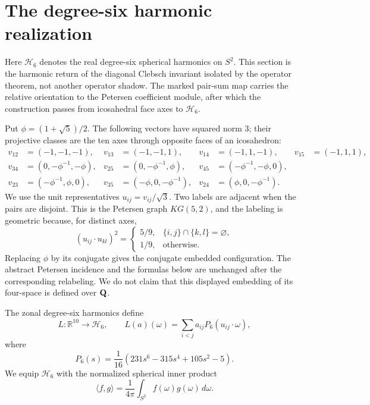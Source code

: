\section{The degree-six harmonic realization}
\label{sec:harmonic}

Here \(\mathcal H_6\) denotes the real degree-six spherical harmonics on
\(S^2\).  This section is the harmonic return of the diagonal Clebsch
invariant isolated by the operator theorem, not another operator shadow.
The marked pair-sum map carries the relative orientation to the Petersen
coefficient module, after which the construction passes from icosahedral
face axes to \(\mathcal H_6\).

Put \(\phi=(1+\sqrt5)/2\).  The following vectors have squared norm \(3\);
their projective classes are the ten axes through opposite faces of an
icosahedron:
\begin{equation}
\label{eq:face-axis-labels}
\begin{aligned}
v_{12}&=(-1,-1,-1),&
v_{13}&=(-1,-1,1),&
v_{14}&=(-1,1,-1),&
v_{15}&=(-1,1,1),\\
v_{34}&=(0,-\phi^{-1},-\phi),&
v_{25}&=(0,-\phi^{-1},\phi),&
v_{45}&=(-\phi^{-1},-\phi,0),\\
v_{23}&=(-\phi^{-1},\phi,0),&
v_{35}&=(-\phi,0,-\phi^{-1}),&
v_{24}&=(\phi,0,-\phi^{-1}).
\end{aligned}
\end{equation}
We use the unit representatives \(u_{ij}=v_{ij}/\sqrt3\).  Two labels are
adjacent when the pairs are disjoint.  This is the Petersen graph
\(KG(5,2)\), and the labeling is geometric because, for distinct axes,
\[
 (u_{ij}\cdot u_{kl})^2=
 \begin{cases}
 5/9,&\{i,j\}\cap\{k,l\}=\varnothing,\\
 1/9,&\text{otherwise}.
 \end{cases}
\]
Replacing \(\phi\) by its conjugate gives the conjugate embedded
configuration.  The abstract Petersen incidence and the formulas below are
unchanged after the corresponding relabeling.  We do not claim that this
displayed embedding of its four-space is defined over \(\mathbf Q\).

The zonal degree-six harmonics define
\[
 L:\mathbb R^{10}\longrightarrow\mathcal H_6,\qquad
 L(a)(\omega)=\sum_{i<j}a_{ij}P_6(u_{ij}\cdot\omega),
\]
where
\[
 P_6(s)=\frac1{16}
 \left(231s^6-315s^4+105s^2-5\right).
\]
We equip \(\mathcal H_6\) with the normalized spherical inner product
\[
 \langle f,g\rangle=\frac1{4\pi}\int_{S^2}f(\omega)g(\omega)\,d\omega.
\]

